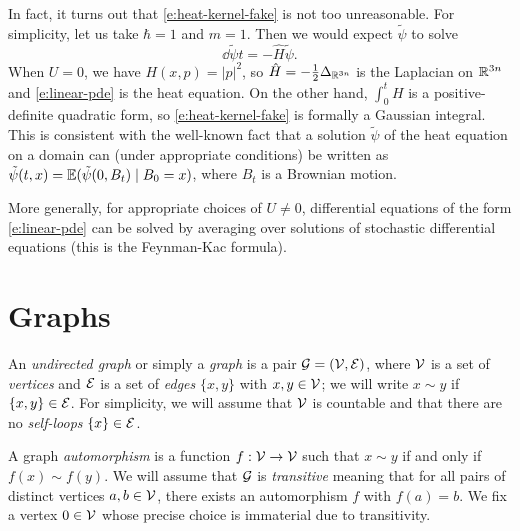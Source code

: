 \begin{rk}
In fact, it turns out that \eqref{e:heat-kernel-fake} is not too unreasonable.
For simplicity, let us take $\hbar = 1$ and $m = 1$.
Then we would expect $\tilde\psi$ to solve
\begin{equation}
\label{e:linear-pde}
\dd{\tilde\psi}{t} = -\hat H \tilde\psi.
\end{equation}
When $U = 0$, we have $H(x, p) = |p|^2$, so $\hat H = -\tfrac12 \Delta_{{\mathbb R}^{3n}}$
is the Laplacian on ${\mathbb R}^{3n}$ and \eqref{e:linear-pde} is the heat equation.
On the other hand, $\int_0^t H$ is a positive-definite quadratic form, so
\eqref{e:heat-kernel-fake} is formally a Gaussian integral. This is consistent
with the well-known fact that a solution $\tilde\psi$ of the heat equation
on a domain can (under appropriate conditions) be written as
$\tilde\psi(t, x) = \mathbb{E}(\tilde\psi(0, B_t) \mid B_0 = x)$,
where $B_t$ is a Brownian motion.

More generally, for appropriate choices of $U \ne 0$, differential equations of
the form \eqref{e:linear-pde} can be solved by averaging over solutions of
stochastic differential equations (this is the Feynman-Kac formula).
\end{rk}


\section{Graphs}
\label{sec:graphs}

An \emph{undirected graph} or simply a \emph{graph} is a pair $\mathcal{G} = (\mathcal{V}, \mathcal{E})$,
where $\mathcal{V}$
is a set of \emph{vertices} and $\mathcal{E}$ is a set of
\emph{edges} $\{ x, y \}$ with $x, y \in \mathcal{V}$; we will write $x \sim y$ if
$\{ x, y \} \in \mathcal{E}$.
For simplicity, we will assume that $\mathcal{V}$ is countable and that there are no
\emph{self-loops} $\{ x \} \in \mathcal{E}$.

A graph \emph{automorphism} is a function $f : \mathcal{V}\rightarrow\mathcal{V}$ such that
$x \sim y$ if and only if $f(x) \sim f(y)$.
We will assume that $\mathcal{G}$ is \emph{transitive} meaning that for all pairs
of distinct
vertices $a, b \in \mathcal{V}$, there exists an automorphism $f$ with $f(a) = b$.
We fix a vertex $0\in\mathcal{V}$ whose precise choice is immaterial due to
transitivity.


